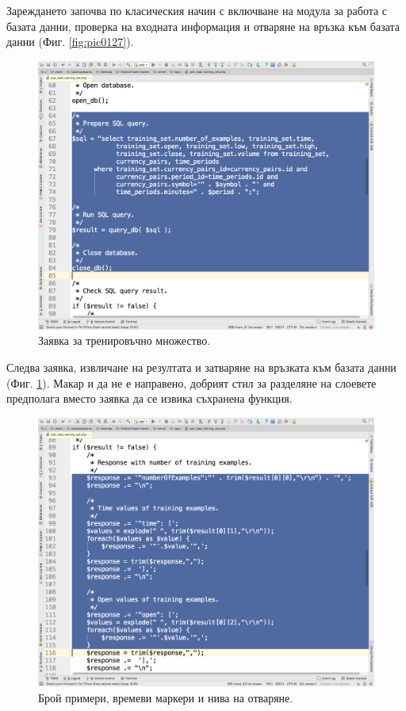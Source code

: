 \documentclass[book,14pt,oneside,openany]{memoir}
\begin{document}
Зареждането започва по класическия начин с включване на модула за работа с базата данни, проверка на входната информация и отваряне на връзка към базата данни (Фиг. \ref{fig:pic0127}).

\begin{figure}[h]
  \centering
  \includegraphics[height=0.45\pdfpageheight]{pic0128}
  \caption{Заявка за тренировъчно множество.}
\label{fig:pic0128}
\end{figure}
\FloatBarrier

Следва заявка, извличане на резултата и затваряне на връзката към базата данни (Фиг. \ref{fig:pic0128}). Макар и да не е направено, добрият стил за разделяне на слоевете предполага вместо заявка да се извика съхранена функция. 

\begin{figure}[h]
  \centering
  \includegraphics[height=0.45\pdfpageheight]{pic0129}
  \caption{Брой примери, времеви маркери и нива на отваряне.}
\label{fig:pic0129}
\end{figure}
\FloatBarrier
\end{document}
